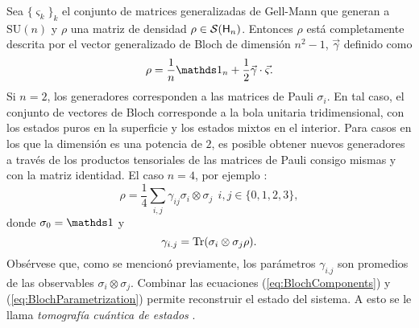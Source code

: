 Sea $\{\varsigma_{k}\}_{k}$ el conjunto de matrices generalizadas de Gell-Mann que generan a $\text{SU}(n)$ y
$\rho$ una matriz de densidad $\rho\in\mathcal{S}({\sf H}_{n})$. Entonces $\rho$ está completamente descrita por el vector generalizado de Bloch de dimensión $n^{2}-1$, $\vec{\gamma}$ definido como
\begin{equation}\label{eq:BlochParametrization}
    \rho=\frac{1}{n}\Id_{n}+\frac{1}{2}\vec{\gamma}\cdot\vec{\varsigma}.
\end{equation}
Si $n=2$, los generadores corresponden a las matrices de Pauli $\sigma_{i}$. En tal caso, el conjunto de vectores de Bloch corresponde a la bola unitaria tridimensional, con los estados puros en la superficie y los estados mixtos en el interior. Para casos en los que la dimensión es una potencia de $2$, es posible obtener nuevos generadores a través de los productos tensoriales de las matrices de Pauli consigo mismas y con la matriz identidad. El caso $n=4$, por ejemplo \cite{Chuang}:
\begin{equation}
    \rho=\frac{1}{4}\sum_{i,j}\gamma_{ij}\sigma_{i}\otimes \sigma_{j} \ \ i,j\in\{0,1,2,3\},\nonumber
\end{equation}
donde $\sigma_{0}=\Id$ y 
\begin{equation}\label{eq:BlochComponents}
        \gamma_{i.j}=\Tr(\sigma_{i}\otimes \sigma_{j}\rho).
\end{equation}
Obsérvese que, como se mencionó previamente, los parámetros $\gamma_{i.j}$ son promedios de las observables $\sigma_i \otimes \sigma_j$. Combinar las ecuaciones (\ref{eq:BlochComponents}) y (\ref{eq:BlochParametrization}) permite reconstruir el estado del sistema. A esto se le llama \textit{tomografía cuántica de estados} \cite{Chuang}.

